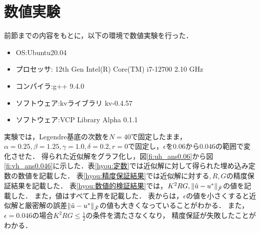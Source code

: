 \chapter{数値実験}\label{Experiment}

前節までの内容をもとに，以下の環境で数値実験を行った．

\begin{itemize}
  \item OS:Ubuntu20.04
  \item プロセッサ: 12th Gen Intel(R) Core(TM) i7-12700   2.10 GHz
  \item コンパイラ:g++ 9.4.0
  \item ソフトウェア:kvライブラリ kv-0.4.57\cite{kv}
  \item ソフトウェア:VCP Library  Alpha 0.1.1\cite{vcp}
\end{itemize}
実験では，Legendre基底の次数を\(N=40\)で固定したまま，\(\alpha=0.25,\beta=1.25,\gamma=1.0,\delta = 0.2,r=0\)で固定し，\(\epsilon\)を\(0.06\)から\(0.046\)の範囲で変化させた．
得られた近似解をグラフ化し，図\ref{fi:uh_ans0.06}から図\ref{fi:vh_ans0.046}に示した．表\ref{hyou:定数}では近似解に対して得られた埋め込み定数の数値を記載した．
表\ref{hyou:精度保証結果}では近似解に対する\(,R,G\)の精度保証結果を記載した．
表\ref{hyou:数値的検証結果}では，\(K^2RG,\norm{\hat{u}-u^*}_{\tilde{\mathcal{F}}}\)の値を記載した．
また，値はすべて上界を記載した．
表からは，\(\epsilon\)の値を小さくすると近似解と厳密解の誤差\(\norm{\hat{u}-u^*}_{\tilde{\mathcal{F}}}\)の値も大きくなっていることがわかる．
また，\(\epsilon=0.046\)の場合\(K^2RG\leq \frac{1}{2}\)の条件を満たさなくなり，
精度保証が失敗したことがわかる．



